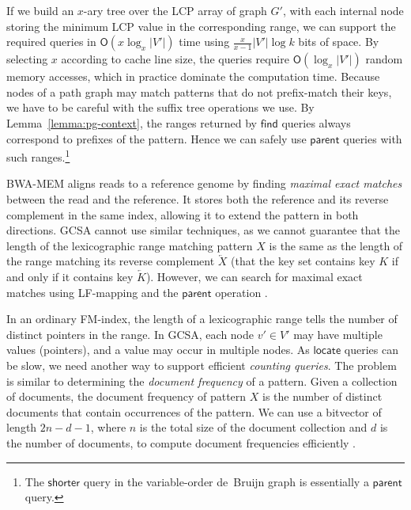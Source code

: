 \documentclass[a4paper,UKenglish]{lipics-v2016}
\newcommand{\abs}[1]{\ensuremath{\lvert #1 \rvert}}
\newcommand{\Oh}[1]{\ensuremath{\mathsf{O}\!\left( #1 \right)}}
\newcommand{\revcomp}[1]{\ensuremath{\overleftarrow{#1}}}
\newcommand{\find}{\ensuremath{\mathsf{find}}}
\newcommand{\locate}{\ensuremath{\mathsf{locate}}}
\newcommand{\parent}{\ensuremath{\mathsf{parent}}}
\newcommand{\LFmapping}{LF\nobreakdash-mapping}
\begin{document}
If we build an $x$\nobreakdash-ary tree over the LCP array of graph $G'$, with each internal node storing the minimum LCP value in the corresponding range, we can support the required queries in $\Oh{x \log_{x} \abs{V'}}$ time using $\frac{x}{x-1} \abs{V'} \log k$ bits of space. By selecting $x$ according to cache line size, the queries require $\Oh{\log_{x} \abs{V'}}$ random memory accesses, which in practice dominate the computation time. Because nodes of a path graph may match patterns that do not prefix-match their keys, we have to be careful with the suffix tree operations we use. By Lemma~\ref{lemma:pg-context}, the ranges returned by $\find$ queries always correspond to prefixes of the pattern. Hence we can safely use $\parent$ queries with such ranges.\footnote{The $\textsf{shorter}$ query in the variable-order de~Bruijn graph \cite{Boucher2014} is essentially a $\parent$ query.}

BWA-MEM \cite{Li2013} aligns reads to a reference genome by finding \emph{maximal exact matches} between the read and the reference. It stores both the reference and its reverse complement in the same index, allowing it to extend the pattern in both directions. GCSA cannot use similar techniques, as we cannot guarantee that the length of the lexicographic range matching pattern $X$ is the same as the length of the range matching its reverse complement $\revcomp{X}$ (that the key set contains key $K$ if and only if it contains key $\revcomp{K}$). However, we can search for maximal exact matches using \LFmapping{} and the $\parent$ operation \cite{Ohlebusch2010a}.

In an ordinary FM\nobreakdash-index, the length of a lexicographic range tells the number of distinct pointers in the range. In GCSA, each node $v' \in V'$ may have multiple values (pointers), and a value may occur in multiple nodes. As $\locate$ queries can be slow, we need another way to support efficient \emph{counting queries}. The problem is similar to determining the \emph{document frequency} of a pattern. Given a collection of documents, the document frequency of pattern $X$ is the number of distinct documents that contain occurrences of the pattern. We can use a bitvector of length $2n-d-1$, where $n$ is the total size of the document collection and $d$ is the number of documents, to compute document frequencies efficiently \cite{Sadakane2007a}.
\end{document}
